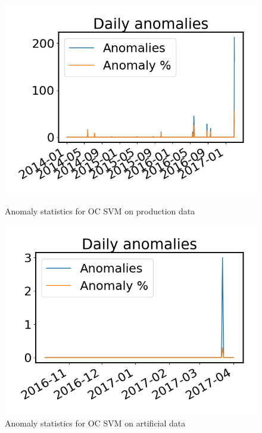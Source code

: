         \begin{figure}[h!]
            \begin{minipage}[b]{0.49\linewidth}
                \centering
                \includegraphics[width=\textwidth]{report/figures/analysis/plant2_train_short/daily_svm_outliers_production_small.png}
                \caption{Anomaly statistics for OC SVM on production data}
                \label{fig:svm_2_outliers_stats_production}
            \end{minipage}
            \hfill\vline\hfill
            \begin{minipage}[b]{0.49\linewidth}
                \centering
                \includegraphics[width=\textwidth]{report/figures/analysis/plant2_train_short/daily_svm_outliers_artificial_small.png}
                \caption{Anomaly statistics for OC SVM on artificial data}
                \label{fig:svm_2_outliers_stats_artificial}
            \end{minipage}
        \end{figure}
        
